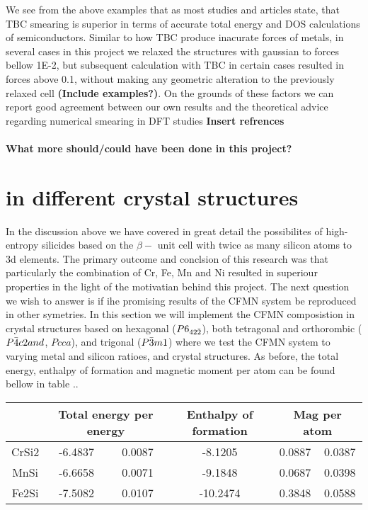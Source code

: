 We see from the above examples that as most studies and articles state, that TBC smearing is superior in terms of accurate total energy and DOS calculations of semiconductors. Similar to how TBC produce inacurate forces of metals, in several cases in this project we relaxed the structures with gaussian to forces bellow 1E-2, but subsequent calculation with TBC in certain cases resulted in forces above 0.1, without making any geometric alteration to the previously relaxed cell \textbf{(Include examples?)}. On the grounds of these factors we can report good agreement between our own results and the theoretical advice regarding numerical smearing in DFT studies \textbf{Insert refrences}

\paragraph{What more should/could have been done in this project?}

\section{ in different crystal structures}

In the discussion above we have covered in great detail the possibilites of high-entropy silicides based on the $\beta-$  unit cell with twice as many silicon atoms to 3d elements. The primary outcome and conclsion of this research was that particularly the combination of Cr, Fe, Mn and Ni resulted in superiour properties in the light of the motivatian behind this project. The next question we wish to answer is if ihe promising results of the CFMN system be reproduced in other symetries. In this section we will implement the CFMN composistion in crystal structures based on hexagonal  ($P6_{42\Bar{2}}$), both tetragonal and orthorombic  ($P\Bar{4}c2 and$, $Pcca$), and trigonal  ($P\Bar{3}m1$) where we test the CFMN system to varying metal and silicon ratioes, and crystal structures. As before, the total energy, enthalpy of formation and magnetic moment per atom can be found bellow in table ..
\begin{table}[h!]
\begin{tabular}{@{}cccccc@{}}
\toprule
            & \multicolumn{2}{c}{Total energy per energy} & Enthalpy of formation & \multicolumn{2}{c}{Mag per atom} \\ \midrule
CrSi2       & -6.4837               & 0.0087              & -8.1205             & 0.0887          & 0.0387         \\
MnSi        & -6.6658               & 0.0071              & -9.1848             & 0.0687          & 0.0398         \\
Fe2Si       & -7.5082               & 0.0107              & -10.2474            & 0.3848          & 0.0588         \\ \bottomrule
\end{tabular}
\end{table}

